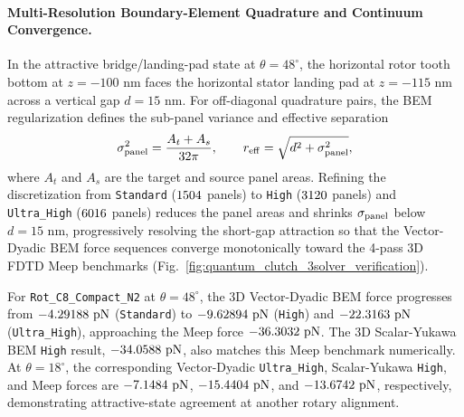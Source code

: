 \documentclass[11pt,letterpaper]{article}
\begin{document}
\paragraph{Multi-Resolution Boundary-Element Quadrature and Continuum Convergence.}
In the attractive bridge/landing-pad state at $\theta=48^\circ$, the horizontal rotor tooth bottom at $z=-100\text{ nm}$ faces the horizontal stator landing pad at $z=-115\text{ nm}$ across a vertical gap $d=15\text{ nm}$. For off-diagonal quadrature pairs, the BEM regularization defines the sub-panel variance and effective separation
\begin{equation}
\sigma_{\rm panel}^2 = \frac{A_t+A_s}{32\pi},
\qquad
r_{\rm eff} = \sqrt{d^2+\sigma_{\rm panel}^2},
\end{equation}
where $A_t$ and $A_s$ are the target and source panel areas. Refining the discretization from \texttt{Standard} ($1504{}$ panels) to \texttt{High} ($3120{}$ panels) and \texttt{Ultra\_High} ($6016{}$ panels) reduces the panel areas and shrinks $\sigma_{\rm panel}$ below $d=15\text{ nm}$, progressively resolving the short-gap attraction so that the Vector-Dyadic BEM force sequences converge monotonically toward the 4-pass 3D FDTD Meep benchmarks (Fig.~\ref{fig:quantum_clutch_3solver_verification}).

For \texttt{Rot\_C8\_Compact\_N2} at $\theta=48^\circ$, the 3D Vector-Dyadic BEM force progresses from $-4.29188{}\text{ pN}$ (\texttt{Standard}) to $-9.62894{}\text{ pN}$ (\texttt{High}) and $-22.3163{}\text{ pN}$ (\texttt{Ultra\_High}), approaching the Meep force $-36.3032{}\text{ pN}$. The 3D Scalar-Yukawa BEM \texttt{High} result, $-34.0588{}\text{ pN}$, also matches this Meep benchmark numerically. At $\theta=18^\circ$, the corresponding Vector-Dyadic \texttt{Ultra\_High}, Scalar-Yukawa \texttt{High}, and Meep forces are $-7.1484{}\text{ pN}$, $-15.4404{}\text{ pN}$, and $-13.6742{}\text{ pN}$, respectively, demonstrating attractive-state agreement at another rotary alignment.
\end{document}
